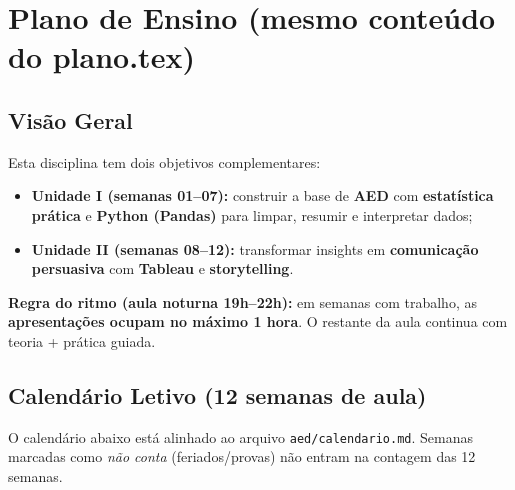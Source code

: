 \chapter{Plano de Ensino (mesmo conteúdo do plano.tex)}


\section{Visão Geral}
Esta disciplina tem dois objetivos complementares:
\begin{itemize}[leftmargin=*]
  \item \textbf{Unidade I (semanas 01--07):} construir a base de \textbf{AED} com \textbf{estatística prática} e \textbf{Python (Pandas)} para limpar, resumir e interpretar dados;
  \item \textbf{Unidade II (semanas 08--12):} transformar insights em \textbf{comunicação persuasiva} com \textbf{Tableau} e \textbf{storytelling}.
\end{itemize}

\begin{NoteBox}
\textbf{Regra do ritmo (aula noturna 19h--22h):} em semanas com trabalho, as \textbf{apresentações ocupam no máximo 1 hora}. O restante da aula continua com teoria + prática guiada.
\end{NoteBox}

\section{Calendário Letivo (12 semanas de aula)}
O calendário abaixo está alinhado ao arquivo \texttt{aed/calendario.md}. Semanas marcadas como \textit{não conta} (feriados/provas) não entram na contagem das 12 semanas.

